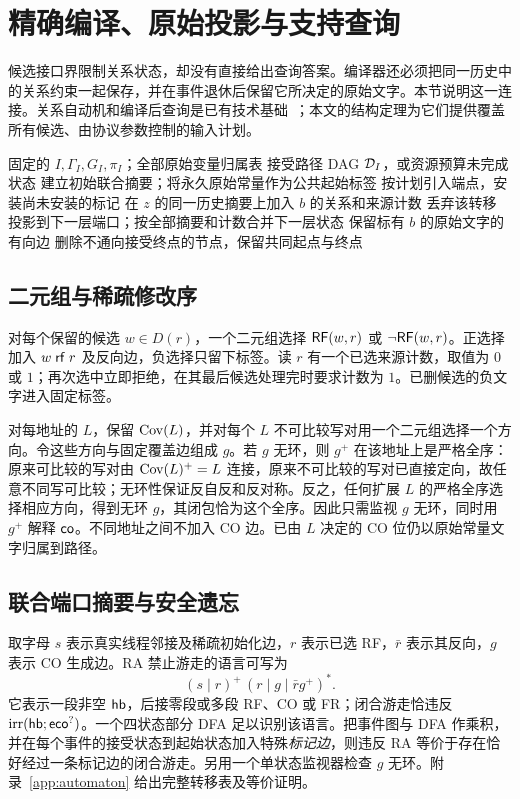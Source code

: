 \section{精确编译、原始投影与支持查询}\label{sec:compilation}
候选接口界限制关系状态，却没有直接给出查询答案。编译器还必须把同一历史中的关系约束一起保存，并在事件退休后保留它所决定的原始文字。本节说明这一连接。关系自动机和编译后查询是已有技术基础~\cite{kater2023,darwiche2002}；本文的结构定理为它们提供覆盖所有候选、由协议参数控制的输入计划。

\begin{algorithm}[ht]
\caption{由已认证计划构造精确表示}\label{alg:compile}
\begin{algorithmic}[1]
\Require 固定的 $I,\Gamma_I,G_I,\pi_I$；全部原始变量归属表
\Ensure 接受路径 DAG $\mathcal{D}_I$，或资源预算未完成状态
\State 建立初始联合摘要；将永久原始常量作为公共起始标签
  \State 按计划引入端点，安装尚未安装的标记
    \State 在 $z$ 的同一历史摘要上加入 $b$ 的关系和来源计数
      \State 丢弃该转移
    \Else
      \State 投影到下一层端口；按全部摘要和计数合并下一层状态
      \State 保留标有 $b$ 的原始文字的有向边
    \EndIf
  \EndFor
\EndFor
\State 删除不通向接受终点的节点，保留共同起点与终点
\end{algorithmic}
\end{algorithm}

\subsection{二元组与稀疏修改序}
对每个保留的候选 $w\in D(r)$，一个二元组选择 $\mathsf{RF}(w,r)$ 或 $\neg\mathsf{RF}(w,r)$。正选择加入 $w\mathrel{\mathsf{rf}} r$ 及反向边，负选择只留下标签。读 $r$ 有一个已选来源计数，取值为 $0$ 或 $1$；再次选中立即拒绝，在其最后候选处理完时要求计数为 $1$。已删候选的负文字进入固定标签。

对每地址的 $L$，保留 $\operatorname{Cov}(L)$，并对每个 $L$ 不可比较写对用一个二元组选择一个方向。令这些方向与固定覆盖边组成 $g$。若 $g$ 无环，则 $g^+$ 在该地址上是严格全序：原来可比较的写对由 $\operatorname{Cov}(L)^+=L$ 连接，原来不可比较的写对已直接定向，故任意不同写可比较；无环性保证反自反和反对称。反之，任何扩展 $L$ 的严格全序选择相应方向，得到无环 $g$，其闭包恰为这个全序。因此只需监视 $g$ 无环，同时用 $g^+$ 解释 $\mathsf{co}$。不同地址之间不加入 CO 边。已由 $L$ 决定的 CO 位仍以原始常量文字归属到路径。

\subsection{联合端口摘要与安全遗忘}\label{sec:ports}
取字母 $s$ 表示真实线程邻接及稀疏初始化边，$r$ 表示已选 RF，$\bar r$ 表示其反向，$g$ 表示 CO 生成边。RA 禁止游走的语言可写为
\begin{equation}\label{eq:language}
 (s\mid r)^+\,(r\mid g\mid\bar r g^+)^*.
\end{equation}
它表示一段非空 $\mathsf{hb}$，后接零段或多段 RF、CO 或 FR；闭合游走恰违反 $\operatorname{irr}(\mathsf{hb};\mathsf{eco}^?)$。一个四状态部分 DFA 足以识别该语言。把事件图与 DFA 作乘积，并在每个事件的接受状态到起始状态加入特殊\emph{标记边}，则违反 RA 等价于存在恰好经过一条标记边的闭合游走。另用一个单状态监视器检查 $g$ 无环。附录~\ref{app:automaton} 给出完整转移表及等价证明。

